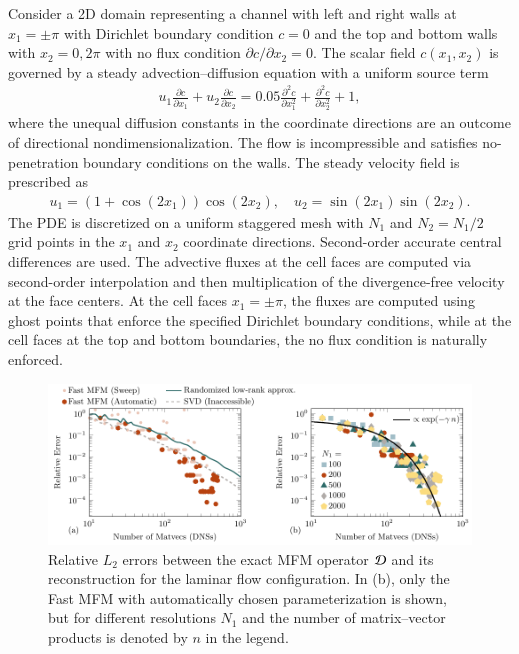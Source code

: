 \documentclass[11pt,sort&compress]{elsarticle}
\begin{document}
Consider a 2D domain representing a channel with left and right walls at $x_1 = \pm \pi$ with Dirichlet boundary condition $c = 0$ and the top and bottom walls with $x_2 = 0,2\pi$ with no flux condition $\partial c/\partial x_2 = 0$.
The scalar field $c(x_1,x_2)$ is governed by a steady advection--diffusion equation with a uniform source term
\begin{gather}
    u_1 \frac{\partial c}{\partial x_1} + u_2 \frac{\partial c}{\partial x_2} = 0.05 \frac{\partial^2 c}{\partial x_1^2} + \frac{\partial^2 c}{\partial x_2^2} + 1,
\end{gather}
where the unequal diffusion constants in the coordinate directions are an outcome of directional nondimensionalization.
The flow is incompressible and satisfies no-penetration boundary conditions on the walls. 
The steady velocity field is prescribed as
\begin{gather}
    u_1 = (1 + \cos(2 x_1))\cos(2 x_2), \quad u_2 =\sin(2 x_1)\sin(2 x_2).
\end{gather}
The PDE is discretized on a uniform staggered mesh with $N_1$ and $N_2 = N_1/2$ grid points in the $x_1$ and $x_2$ coordinate directions. 
Second-order accurate central differences are used. 
The advective fluxes at the cell faces are computed via second-order interpolation and then multiplication of the divergence-free velocity at the face centers.
At the cell faces $x_1=\pm \pi$, the fluxes are computed using ghost points that enforce the specified Dirichlet boundary conditions, while at the cell faces at the top and bottom boundaries, the no flux condition is naturally enforced. 

\begin{figure}
    \centering
    \includegraphics[scale=1]{figures/err-peel-laminar.pdf}
    \caption{
        Relative $L_2$ errors between the exact MFM operator $\mathcal{D}$ and its reconstruction for the laminar flow configuration.
        In (b), only the Fast MFM with automatically chosen parameterization is shown, but for different resolutions $N_1$ and the number of matrix--vector products is denoted by $n$ in the legend.
    }
    \label{f:error_peeeling_lam}
\end{figure}
\end{document}
